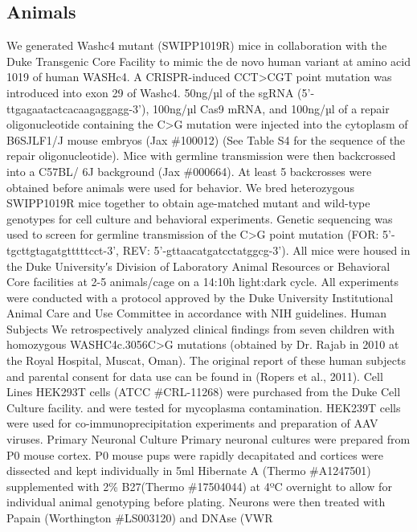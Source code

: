
\subsection{Animals}

We generated Washc4 mutant (SWIPP1019R) mice in collaboration with the
Duke Transgenic Core Facility to mimic the de novo human variant at amino acid
1019 of human WASHc4. A CRISPR-induced CCT>CGT point mutation was introduced
into exon 29 of Washc4. 50ng/µl of the sgRNA (5’-ttgagaatactcacaagaggagg-3’),
100ng/µl Cas9 mRNA, and 100ng/µl of a repair oligonucleotide containing the C>G
mutation were injected into the cytoplasm of B6SJLF1/J mouse embryos (Jax
\#100012) (See Table S4 for the sequence of the repair oligonucleotide). Mice
with germline transmission were then backcrossed into a C57BL/ 6J background
(Jax \#000664). At least 5 backcrosses were obtained before animals were used for
behavior. We bred heterozygous SWIPP1019R mice together to obtain age-matched
mutant and wild-type genotypes for cell culture and behavioral experiments.
Genetic sequencing was used to screen for germline transmission of the C>G point
mutation (FOR: 5’-tgcttgtagatgtttttcct-3’, REV: 5’-gttaacatgatcctatggcg-3’). All
mice were housed in the Duke University′s Division of Laboratory Animal
Resources or Behavioral Core facilities at 2-5 animals/cage on a 14:10h
light:dark cycle. All experiments were conducted with a protocol approved by the
Duke University Institutional Animal Care and Use Committee in accordance with
NIH guidelines. 
Human Subjects
We retrospectively analyzed clinical findings from seven children with
homozygous WASHC4c.3056C>G mutations (obtained by Dr. Rajab in 2010 at the Royal
Hospital, Muscat, Oman). The original report of these human subjects and
parental consent for data use can be found in (Ropers et al., 2011). 
Cell Lines
HEK293T cells (ATCC \#CRL-11268) were purchased from the Duke Cell Culture
facility. and were tested for mycoplasma contamination. HEK239T cells were used
for co-immunoprecipitation experiments and preparation of AAV viruses.
Primary Neuronal Culture
Primary neuronal cultures were prepared from P0 mouse cortex. P0 mouse pups were
rapidly decapitated and cortices were dissected and kept individually in 5ml
Hibernate A (Thermo \#A1247501) supplemented with 2\% B27(Thermo \#17504044) at 4ºC
overnight to allow for individual animal genotyping before plating. Neurons were
then treated with Papain (Worthington \#LS003120) and DNAse (VWR
